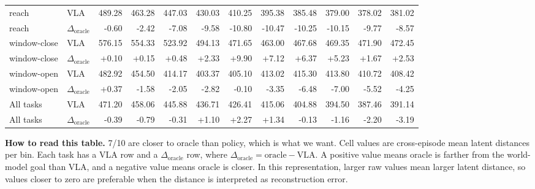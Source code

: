 \documentclass{article}
\begin{document}
\begin{center}
{\begin{tabular}{llrrrrrrrrrr}
\hline
reach & VLA & 489.28 & 463.28 & 447.03 & 430.03 & 410.25 & 395.38 & 385.48 & 379.00 & 378.02 & 381.02 \\
reach & $\Delta_{\mathrm{oracle}}$ & -0.60 & -2.42 & -7.08 & -9.58 & -10.80 & -10.47 & -10.25 & -10.15 & -9.77 & -8.57 \\
\hline
window-close & VLA & 576.15 & 554.33 & 523.92 & 494.13 & 471.65 & 463.00 & 467.68 & 469.35 & 471.90 & 472.45 \\
window-close & $\Delta_{\mathrm{oracle}}$ & +0.10 & +0.15 & +0.48 & +2.33 & +9.90 & +7.12 & +6.37 & +5.23 & +1.67 & +2.53 \\
\hline
window-open & VLA & 482.92 & 454.50 & 414.17 & 403.37 & 405.10 & 413.02 & 415.30 & 413.80 & 410.72 & 408.42 \\
window-open & $\Delta_{\mathrm{oracle}}$ & +0.37 & -1.58 & -2.05 & -2.82 & -0.10 & -3.35 & -6.48 & -7.00 & -5.52 & -4.25 \\
\hline
All tasks & VLA & 471.20 & 458.06 & 445.88 & 436.71 & 426.41 & 415.06 & 404.88 & 394.50 & 387.46 & 391.14 \\
All tasks & $\Delta_{\mathrm{oracle}}$ & -0.39 & -0.79 & -0.31 & +1.10 & +2.27 & +1.34 & -0.13 & -1.16 & -2.20 & -3.19 \\
\hline
\hline
\end{tabular}
}
\end{center}
\par\vspace{0.3em}
\noindent\small\textbf{How to read this table.} 7/10 are closer to oracle than policy, which is what we want. Cell values are cross-episode mean latent distances per bin. Each task has a VLA row and a \(\Delta_{\mathrm{oracle}}\) row, where \(\Delta_{\mathrm{oracle}} = \mathrm{oracle} - \mathrm{VLA}\). A positive value means oracle is farther from the world-model goal than VLA, and a negative value means oracle is closer. In this representation, larger raw values mean larger latent distance, so values closer to zero are preferable when the distance is interpreted as reconstruction error.




\end{document}
